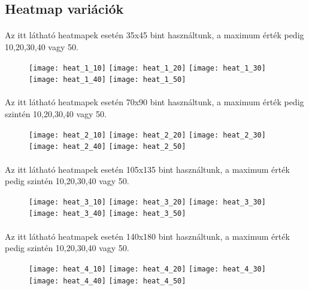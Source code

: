 	\subsection{Heatmap variációk}
	\paragraph{}
	Az itt látható heatmapek esetén 35x45 bint használtunk, a maximum érték pedig 10,20,30,40 vagy 50. 
	\begin{figure}[h]
		\begin{multicols}{2}
			\texttt{[image: heat\_1\_10]}
			\texttt{[image: heat\_1\_20]}
			\texttt{[image: heat\_1\_30]}
			\texttt{[image: heat\_1\_40]}
			\texttt{[image: heat\_1\_50]}		
		\end{multicols}
	\end{figure}
	\clearpage	
	\paragraph{}
	Az itt látható heatmapek esetén 70x90 bint használtunk, a maximum érték pedig szintén 10,20,30,40 vagy 50. 
	\begin{figure}[h]
		\begin{multicols}{2}
			\texttt{[image: heat\_2\_10]}
			\texttt{[image: heat\_2\_20]}
			\texttt{[image: heat\_2\_30]}
			\texttt{[image: heat\_2\_40]}
			\texttt{[image: heat\_2\_50]}		
		\end{multicols}
	\end{figure}	
	\clearpage	
	\paragraph{}
	Az itt látható heatmapek esetén 105x135 bint használtunk, a maximum érték pedig szintén 10,20,30,40 vagy 50. 
	\begin{figure}[h]
		\begin{multicols}{2}
			\texttt{[image: heat\_3\_10]}
			\texttt{[image: heat\_3\_20]}
			\texttt{[image: heat\_3\_30]}
			\texttt{[image: heat\_3\_40]}
			\texttt{[image: heat\_3\_50]}		
		\end{multicols}
	\end{figure}	
	\clearpage	
	\paragraph{}
	Az itt látható heatmapek esetén 140x180 bint használtunk, a maximum érték pedig szintén 10,20,30,40 vagy 50. 
	\begin{figure}[h]
		\begin{multicols}{2}
			\texttt{[image: heat\_4\_10]}
			\texttt{[image: heat\_4\_20]}
			\texttt{[image: heat\_4\_30]}
			\texttt{[image: heat\_4\_40]}
			\texttt{[image: heat\_4\_50]}		
		\end{multicols}
	\end{figure}	
	\clearpage	
